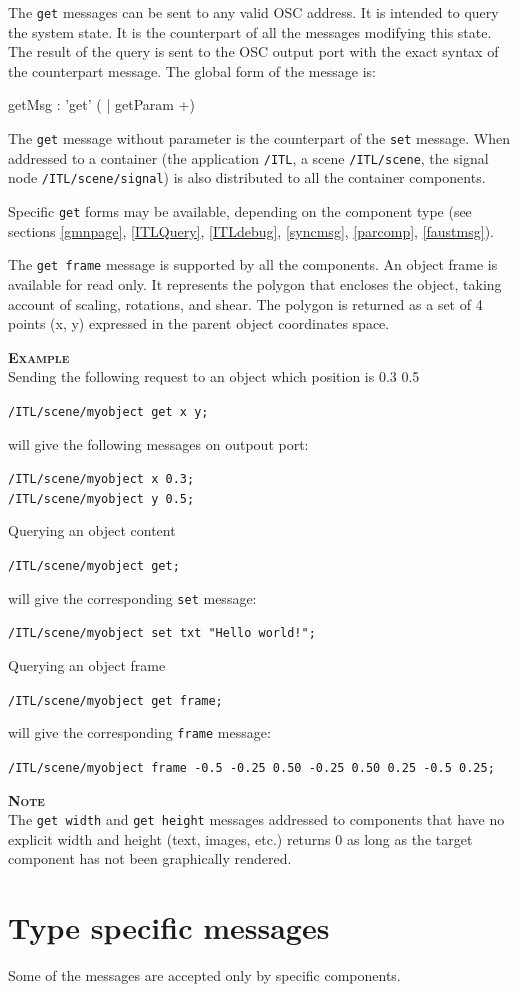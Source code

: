 \documentclass[a4paper,twoside]{report}
\newcommand{\toplevel}[1]	{\chapter{#1}}
\newcommand{\sublevel}[1]	{\section{#1}}
\newcommand{\OSC}[1]		{\texttt{#1}}
\newcommand{\example}		{\textbf{\hspace{-1.5cm}\textbf{\textsc{Example }}}}
\newcommand{\note}	[1]		{\vspace{2mm}\textbf{\hspace{-0.9cm}\textbf{\textsc{Note #1}}}}
\newcommand{\sample}	[1]			{\vspace{-2mm}\begin{center}\colorbox{mygrey}{
								\begin{minipage}[t]{0.9\columnwidth} 
								{\small \texttt{#1}}
								\end{minipage}}\end{center}}
\newcommand{\sampleindent}	{ \hspace{0.5cm} }
\begin{document}
The \OSC{get} messages can be sent to any valid OSC address. It is intended to query the system state. It is the counterpart of all the messages modifying this state.  The result of the query is sent to the OSC output port with the exact syntax of the counterpart message. 
The global form of the message is:
\begin{rail}
getMsg : 'get' ( | getParam +)
\end{rail}

The \OSC{get} message without parameter is the counterpart of the \OSC{set} message. When addressed to a container (the application \OSC{/ITL}, a scene \OSC{/ITL/scene}, the signal node \OSC{/ITL/scene/signal}) is also distributed to all the container components.

Specific \OSC{get} forms may be available, depending on the component type (see sections \ref{gmnpage},  \ref{ITLQuery}, \ref{ITLdebug}, \ref{syncmsg}, \ref{parcomp}, \ref{faustmsg}).

The \OSC{get frame} message is supported by all the components. An object frame is available for read only. It represents the polygon that encloses the object, taking account of scaling, rotations, and shear. The polygon is returned as a set of 4 points (x, y) expressed in the parent object coordinates space.

\example \\
Sending the following request to an object which position is 0.3 0.5
\sample{/ITL/scene/myobject get x y;}
\sampleindent will give the following messages on outpout port:
\sample{/ITL/scene/myobject x 0.3; \\
/ITL/scene/myobject y 0.5;}
Querying an object content
\sample{/ITL/scene/myobject get;}
\sampleindent will give the corresponding \OSC{set} message:
\sample{/ITL/scene/myobject set txt "Hello world!";}
Querying an object frame
\sample{/ITL/scene/myobject get frame;}
\sampleindent will give the corresponding \OSC{frame} message:
\sample{/ITL/scene/myobject frame -0.5 -0.25 0.50 -0.25 0.50 0.25 -0.5 0.25;}


\note{} \\
The \OSC{get width} and \OSC{get height} messages addressed to components that have no explicit width and height (text, images, etc.) returns 0 as long as the target component has not been graphically rendered.


\toplevel{Type specific messages}
\label{specificMsg}
Some of the messages are accepted only by specific components.
\end{document}
